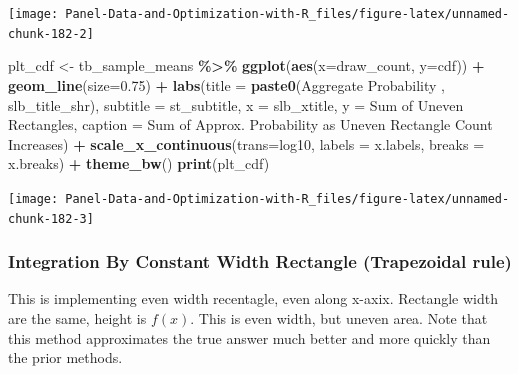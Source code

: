\documentclass[
]{book}
\newenvironment{Shaded}{\begin{snugshade}}{\end{snugshade}}
\newcommand{\DataTypeTok}[1]{\textcolor[rgb]{0.13,0.29,0.53}{#1}}
\newcommand{\FloatTok}[1]{\textcolor[rgb]{0.00,0.00,0.81}{#1}}
\newcommand{\KeywordTok}[1]{\textcolor[rgb]{0.13,0.29,0.53}{\textbf{#1}}}
\newcommand{\NormalTok}[1]{#1}
\newcommand{\OperatorTok}[1]{\textcolor[rgb]{0.81,0.36,0.00}{\textbf{#1}}}
\newcommand{\StringTok}[1]{\textcolor[rgb]{0.31,0.60,0.02}{#1}}
\begin{document}
\begin{center}\texttt{[image: Panel-Data-and-Optimization-with-R\_files/figure-latex/unnamed-chunk-182-2]} \end{center}

\begin{Shaded}
\begin{Highlighting}[]
\NormalTok{plt\_cdf \textless{}{-}}\StringTok{ }\NormalTok{tb\_sample\_means }\OperatorTok{\%\textgreater{}\%}
\StringTok{  }\KeywordTok{ggplot}\NormalTok{(}\KeywordTok{aes}\NormalTok{(}\DataTypeTok{x=}\NormalTok{draw\_count, }\DataTypeTok{y=}\NormalTok{cdf)) }\OperatorTok{+}
\StringTok{  }\KeywordTok{geom\_line}\NormalTok{(}\DataTypeTok{size=}\FloatTok{0.75}\NormalTok{) }\OperatorTok{+}
\StringTok{  }\KeywordTok{labs}\NormalTok{(}\DataTypeTok{title =} \KeywordTok{paste0}\NormalTok{(}\StringTok{\textquotesingle{}Aggregate Probability \textquotesingle{}}\NormalTok{, slb\_title\_shr),}
       \DataTypeTok{subtitle =}\NormalTok{ st\_subtitle,}
       \DataTypeTok{x =}\NormalTok{ slb\_xtitle,}
       \DataTypeTok{y =} \StringTok{\textquotesingle{}Sum of Uneven Rectangles\textquotesingle{}}\NormalTok{,}
       \DataTypeTok{caption =} \StringTok{\textquotesingle{}Sum of Approx. Probability as Uneven Rectangle Count Increases\textquotesingle{}}\NormalTok{) }\OperatorTok{+}
\StringTok{  }\KeywordTok{scale\_x\_continuous}\NormalTok{(}\DataTypeTok{trans=}\StringTok{\textquotesingle{}log10\textquotesingle{}}\NormalTok{, }\DataTypeTok{labels =}\NormalTok{ x.labels, }\DataTypeTok{breaks =}\NormalTok{ x.breaks) }\OperatorTok{+}
\StringTok{  }\KeywordTok{theme\_bw}\NormalTok{()}
\KeywordTok{print}\NormalTok{(plt\_cdf)}
\end{Highlighting}
\end{Shaded}

\begin{center}\texttt{[image: Panel-Data-and-Optimization-with-R\_files/figure-latex/unnamed-chunk-182-3]} \end{center}

\hypertarget{integration-by-constant-width-rectangle-trapezoidal-rule}{%
\subsubsection{Integration By Constant Width Rectangle (Trapezoidal rule)}\label{integration-by-constant-width-rectangle-trapezoidal-rule}}

This is implementing even width recentagle, even along x-axix. Rectangle width are the same, height is \(f(x)\). This is even width, but uneven area. Note that this method approximates the true answer much better and more quickly than the prior methods.
\end{document}

